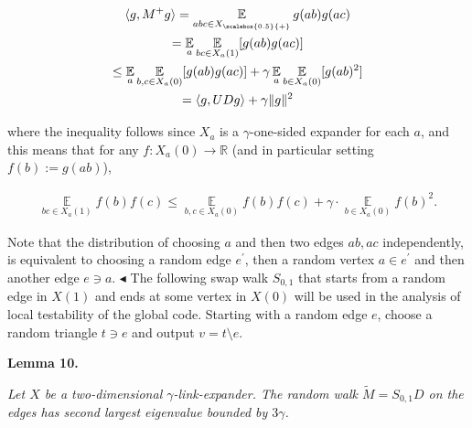 \[\begin{gathered}
\displaystyle\langle g,M^{+}g\rangle \displaystyle=\operatorname*{\mathbb{E}}_{abc\in{X}_{\scalebox{0.5}{+}}}g(ab)g(ac) \\
\displaystyle=\operatorname*{\mathbb{E}}_{a}\operatorname*{\mathbb{E}}_{bc\in X_{a}(1)}[g(ab)g(ac)] \\
\displaystyle\leq\operatorname*{\mathbb{E}}_{a}\operatorname*{\mathbb{E}}_{b,c\in X_{a}(0)}[g(ab)g(ac)]+\gamma\operatorname*{\mathbb{E}}_{a}\operatorname*{\mathbb{E}}_{b\in X_{a}(0)}[g(ab)^{2}] \\
\displaystyle=\langle g,UDg\rangle+\gamma\lVert g\rVert^{2}
\end{gathered}\]


where the inequality follows since $X_{a}$ is a $\gamma$-one-sided expander for each $a$, and this means that for any $f:X_{a}(0)\to\mathbb{R}$ (and in particular setting $f(b):=g(ab)$),\par


\[\begin{gathered}
\operatorname*{\mathbb{E}}_{bc\in X_{a}(1)}f(b)f(c)\leq\operatorname*{\mathbb{E}}_{b,c\in X_{a}(0)}f(b)f(c)+\gamma\cdot\operatorname*{\mathbb{E}}_{b\in X_{a}(0)}f(b)^{2}.
\end{gathered}\]


Note that the distribution of choosing $a$ and then two edges $ab,ac$ independently, is equivalent to choosing a random edge $e^{\prime}$, then a random vertex $a\in e^{\prime}$ and then another edge $e\ni a$.
$\blacktriangleleft$
The following swap walk $S_{0,1}$ that starts from a random edge in $X(1)$ and ends at some vertex in $X(0)$ will be used in the analysis of local testability of the global code. Starting with a random edge $e$, choose a random triangle $t\ni e$ and output $v=t\setminus e$.\par





\par\medskip\noindent\textbf{
\textbf{Lemma 10}\textbf{.}
}\par



\emph{Let $X$ be a two-dimensional $\gamma$-link-expander. The random walk $\tilde{M}=S_{0,1}D$ on the edges has second largest eigenvalue bounded by $3\gamma$.}\par







